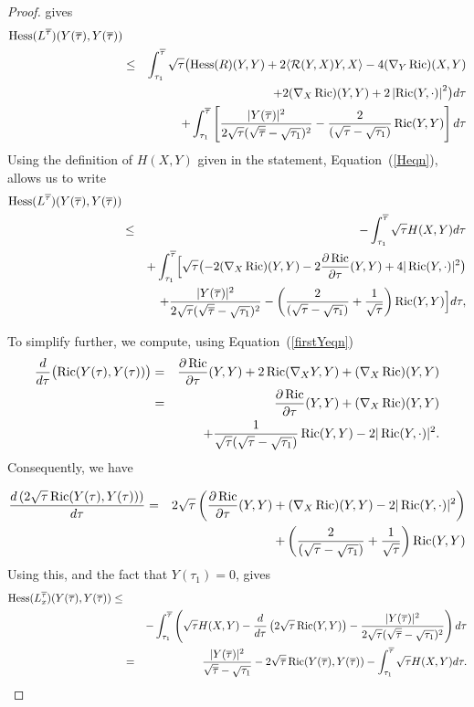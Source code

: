 \begin{proof}
gives
\begin{eqnarray*}
\operatorname{Hess}(L^{\overline\tau})(Y(\overline\tau),Y(\overline\tau)) \\ &
\le & \int_{\tau_1}^{\overline\tau} \sqrt{\tau}\bigl(\operatorname{Hess}(R)(Y,Y) +
2\langle {\mathcal R}(Y,X)Y,X\rangle  - 4(\nabla_{Y}\operatorname{Ric})(X,Y)\bigr. \\
& &  \ \ \ \ \bigl. +2(\nabla_X\operatorname{Ric})(Y,Y) +
 2\left\vert\operatorname{Ric}(Y,\cdot)\right\vert^{2}\bigr)d\tau \\ & &
 +\int_{\tau_1}^{\overline\tau}\left[
\frac{|Y(\overline\tau)|^2}{2\sqrt{\tau}(\sqrt{\overline\tau}-\sqrt{\tau_1})^2}
- \frac{2}{(\sqrt{\tau}-\sqrt{\tau_1})}\operatorname{Ric}(Y,Y)\right] d\tau
\end{eqnarray*}
 Using the definition of $H(X,Y)$ given in the statement, Equation~(\ref{Heqn}),
 allows us to write
\begin{eqnarray*}
\operatorname{Hess}(L^{\overline\tau})(Y(\overline\tau),Y(\overline\tau)) \\
 & \le &
-\int_{\tau_1}^{\overline\tau}\sqrt{\tau}H(X,Y)d\tau \\ & &
+\int_{\tau_1}^{\overline\tau}\Bigl[\sqrt{\tau} \bigl(-2(\nabla_{X}\operatorname{Ric})(Y,Y)
-2\frac{\partial\operatorname{Ric}}{\partial\tau}(Y,Y) +4|\operatorname{Ric}(Y,\cdot)|^2 \bigr) \Bigr.\\
& & \Bigl.+
\frac{|Y(\overline\tau)|^2}{2\sqrt{\tau}(\sqrt{\overline\tau}-\sqrt{\tau_1})^2}
-\left(\frac{2}{(\sqrt{\tau}-
\sqrt{\tau_1})}+\frac{1}{\sqrt{\tau}}\right) \operatorname{Ric}(Y,Y)\Bigr]d\tau,
\end{eqnarray*}

 To simplify
further, we compute, using Equation~(\ref{firstYeqn})
\begin{eqnarray*}
    \frac{d}{d\tau}\bigl(\operatorname{Ric}(Y(\tau),Y(\tau))\bigr) &= & \frac{\partial\operatorname{Ric}}{\partial{\tau}}(Y,Y) +
        2\operatorname{Ric}(\nabla_{X}Y,Y) + (\nabla_{X}\operatorname{Ric})(Y,Y)\\
        & = & \frac{\partial\operatorname{Ric}}{\partial{\tau}}(Y,Y)+ (\nabla_{X}\operatorname{Ric})(Y,Y) \\ & & +
\frac{1}{\sqrt{\tau}(\sqrt{\tau}-\sqrt{\tau_1})}\operatorname{Ric}(Y,Y) -
2|\operatorname{Ric}(Y,\cdot)|^{2}.
\end{eqnarray*}
 Consequently, we have

\begin{eqnarray*}
\frac{d\left(2\sqrt{\tau}\operatorname{Ric}(Y(\tau),Y(\tau))\right)}{d\tau} &
= & 2\sqrt{\tau}\left(\frac{\partial\operatorname{Ric}}{\partial{\tau}}(Y,Y)
+ (\nabla_{X}\operatorname{Ric})(Y,Y)- 2|\operatorname{Ric}(Y,\cdot)|^{2}\right)\\
 & & + \left(\frac{2}{(\sqrt{\tau}-\sqrt{\tau_1})} +\frac{1}{\sqrt{\tau}}\right)\operatorname{Ric}(Y,Y)
\end{eqnarray*}
Using this, and the fact that $Y(\tau_1)=0$, gives
\begin{eqnarray}\label{Hessineq1}
\operatorname{Hess}(L_x^{\overline\tau})(Y(\overline\tau),Y(\overline\tau)) \le  \\
 &  &
-\int_{\tau_1}^{\overline\tau}\left(\sqrt{\tau}H(X,Y)
-\frac{d}{d\tau}\left(2\sqrt{\tau}\operatorname{Ric}(Y,Y)\right)
-\frac{|Y(\overline\tau)|^2}{2\sqrt{\tau}(\sqrt{\overline\tau}-\sqrt{\tau_1})^2}\right)d\tau \nonumber\\
 & = &
\frac{|Y(\overline\tau)|^2}{\sqrt{\overline\tau}-\sqrt{\tau_1}}
-2\sqrt{\overline\tau}\operatorname{Ric}(Y(\overline\tau),Y(\overline\tau))-\int_{\tau_1}^{\overline\tau}\sqrt{\tau}H(X,Y)d\tau.
\nonumber
\end{eqnarray}


\end{proof}
